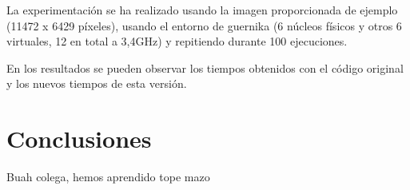 \documentclass[12pt]{report} %
\begin{document}
La experimentación se ha realizado usando la imagen proporcionada de ejemplo (11472 x 6429 píxeles), usando el entorno de guernika (6 núcleos físicos y otros 6 virtuales, 12 en total a 3,4GHz) y repitiendo durante 100 ejecuciones.

En los resultados se pueden observar los tiempos obtenidos con el código original y los nuevos tiempos de esta versión.

\chapter{Conclusiones}

Buah colega, hemos aprendido tope mazo





\nocite{*} %

\clearpage
{}
\printbibliography
\end{document}
